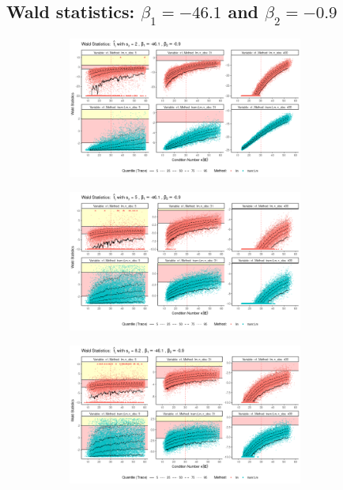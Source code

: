 \documentclass[11pt,a4paper,twoside]{book}\usepackage[]{graphicx}\usepackage[]{xcolor}
\begin{document}
\newpage
\subsection{Wald statistics: $\beta_1=-46.1$ and $\beta_2=-0.9$}
\begin{figure}[H]
\centering
\begin{subfigure}[b]{1\textwidth}
\vspace*{-0.5cm}
\centering
\includegraphics[width=0.85\textwidth]{../fromsim/simres_wald11-1.png}
\end{subfigure}
\begin{subfigure}[b]{1\textwidth}
\vspace*{-0.9cm}
\centering
\includegraphics[width=0.85\textwidth]{../fromsim/simres_wald21-1.png}
\end{subfigure}
\begin{subfigure}[b]{1\textwidth}
\vspace*{-0.9cm}
\centering
\includegraphics[width=0.85\textwidth]{../fromsim/simres_wald31-1.png}

\end{subfigure}
\end{figure}
\end{document}
